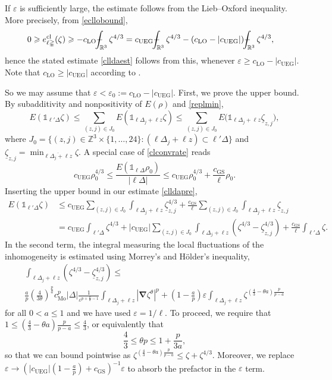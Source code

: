 \documentclass[final,onefignum,onetabnum,reqno]{amsart}
\theoremstyle{remark}
\renewcommand{\le}{\leqslant}
\renewcommand{\ge}{\geqslant}
\renewcommand{\epsilon}{\varepsilon}
\newcommand{\ol}[1]{\overline{#1}}
\newcommand{\ul}[1]{\underline{#1}}
\newcommand{\RR}{\mathbb{R}}
\newcommand{\ZZ}{\mathbb{Z}}
\newcommand{\cl}{\mathrm{cl}} %
\newcommand{\LO}{\mathrm{LO}} %
\newcommand{\UEG}{\mathrm{UEG}} %
\newcommand{\GS}{\mathrm{GS}} %
\newcommand{\Mo}{\mathrm{Mo}} %
\newcommand{\iden}{\mathbb{1}} %
\newcommand{\grad}{\bm{\nabla}} %
\newcommand{\tetra}{\mathbb{\Delta}} %
\def\Xint#1{\mathchoice
{\XXint\displaystyle\textstyle{#1}}%
{\XXint\textstyle\scriptstyle{#1}}%
{\XXint\scriptstyle\scriptscriptstyle{#1}}%
{\XXint\scriptscriptstyle\scriptscriptstyle{#1}}%
\!\int}
\def\XXint#1#2#3{{\setbox0=\hbox{$#1{#2#3}{\int}$ }
\vcenter{\hbox{$#2#3$ }}\kern-.6\wd0}}
\def\dashint{\Xint-}
\begin{document}
If $\epsilon$ is sufficiently large, the estimate follows from the Lieb--Oxford inequality. More precisely,
from \cref{ecllobound},
\begin{align*}
0\ge e_{\ell\tetra}^\cl(\zeta)&\ge -c_\LO \dashint_{\RR^3} \zeta^{4/3}= c_\UEG \dashint_{\RR^3} \zeta^{4/3} - (c_\LO-|c_\UEG|) \dashint_{\RR^3} \zeta^{4/3},
\end{align*}
hence the stated estimate \cref{clldaest} follows from this, whenever $\epsilon\ge c_\LO-|c_\UEG|$.
Note that $c_\LO\ge |c_\UEG|$ according to \cite{lewin2018statistical}.

So we may assume that $\epsilon<\epsilon_0:=c_\LO-|c_\UEG|$. First, we prove the upper bound. By subadditivity and nonpositivity of $E(\rho)$ and \cref{replmin}, 
\begin{equation}\label{clldapre}
E(\iden_{\ell'\tetra}\zeta)\le \sum_{(z,j)\in J_0} E(\iden_{\ell\tetra_j+\ell z}\zeta)
\le \sum_{(z,j)\in J_0} E\bigl(\iden_{\ell\tetra_j+\ell z}\ul{\zeta}_{z,j}\bigr),
\end{equation}
where $J_0=\{(z,j)\in\ZZ^3\times\{1,\ldots,24\} : (\ell\tetra_j+\ell z)\subset \ell'\tetra\}$
and $\ul{\zeta}_{z,j}=\min_{\ol{\ell\tetra_j+\ell z}}\zeta$.
A special case of \cref{clconvrate} reads
\begin{equation}\label{cluegapri}
c_\UEG \rho_0^{4/3} \le \frac{E(\iden_{\ell\tetra}\rho_0)}{|\ell\tetra|} \le c_\UEG\rho_0^{4/3} + \frac{c_\GS}{\ell} \rho_0.
\end{equation}
Inserting the upper bound in our estimate \cref{clldapre},
\begin{align*}
E(\iden_{\ell'\tetra}\zeta)&\le c_\UEG \sum_{(z,j)\in J_0} \int_{\ell\tetra_j+\ell z} \ul{\zeta}_{z,j}^{4/3}  
+ \frac{c_\GS}{\ell} \sum_{(z,j)\in J_0} \int_{\ell\tetra_j+\ell z} \ul{\zeta}_{z,j}\\
&= c_\UEG \int_{\ell'\tetra} \zeta^{4/3} + 
|c_\UEG| \sum_{(z,j)\in J_0} \int_{\ell\tetra_j+\ell z} \left(\zeta^{4/3}-\ul{\zeta}_{z,j}^{4/3}\right) + \frac{c_\GS}{\ell}\int_{\ell'\tetra} \zeta.
\end{align*}
In the second term, the integral measuring the local fluctuations of the inhomogeneity is estimated using Morrey's and H\"older's inequality,
\begin{multline}\label{locflucest}
\int_{\ell\tetra_j+\ell z} \left(\zeta^{4/3}-\ul{\zeta}_{z,j}^{4/3}\right)\le\\
\frac{a}{p}\left(\frac{4}{3\theta}\right)^{\frac{p}{a}} c_\Mo^p |\tetra| \frac{1}{\epsilon^{p+\frac{p}{a}-1}} \int_{\ell\tetra_j+\ell z} |\grad\zeta^\theta|^p
+ \left(1-\frac{a}{p}\right)\epsilon \int_{\ell\tetra_j+\ell z} \zeta^{\left(\frac{4}{3}-\theta a\right)\frac{p}{p-a}}
\end{multline}
for all $0<a\le 1$ and we have used $\epsilon=1/\ell$. To proceed, we require that
$1\le \left(\frac{4}{3}-\theta a\right)\frac{p}{p-a}\le \frac{4}{3}$, or equivalently that
$$
\frac{4}{3}\le \theta p\le 1 + \frac{p}{3a},
$$
so that we can bound pointwise as $\zeta^{\left(\frac{4}{3}-\theta a\right)\frac{p}{p-a}}\le \zeta + \zeta^{4/3}$. 
Moreover, we replace $\epsilon\to \left(|c_\UEG|\left(1-\frac{a}{p}\right)+c_\GS\right)^{-1} \epsilon$ to absorb
the prefactor in the $\epsilon$ term.
\end{document}
